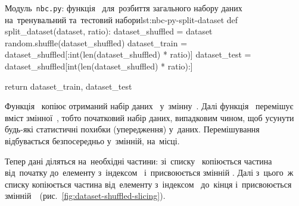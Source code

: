 \documentclass[
	a4paper,
	oneside,
	DIV = 12,
	fontsize = 13pt,
	headings = normal,
	numbers = endperiod,
]{scrartcl}
\theoremstyle{mythm}
\newcommand{\filename}[1]{\texttt{#1}}
\begin{document}
				\begin{listingpython}{Модуль~\filename{nbc.py}: функція~ для~розбиття загального набору даних на~тренувальний та~тестовий набори}{lst:nbc-py-split-dataset}
	def split_dataset(dataset, ratio):
			dataset_shuffled = dataset
			random.shuffle(dataset_shuffled)
			dataset_train = dataset_shuffled[:int(len(dataset_shuffled) * ratio)]
			dataset_test = dataset_shuffled[int(len(dataset_shuffled) * ratio):]

			return dataset_train, dataset_test
					\end{listingpython}

					Функція~ копіює отриманий набір даних~ у~змінну~. Далі функція~ перемішує вміст змінної~, тобто початковий набір даних, випадковим чином, щоб усунути будь-які статистичні похибки (упередження) у~даних. Перемішування відбувається безпосередньо у~змінній, на~місці.
					
					Тепер дані діляться на~необхідні частини: зі~списку~ копіюється частина від~початку до~елементу з~індексом~ і~присвоюється змінній . Далі з~цього~ж списку копіюється частина від~елементу з~індексом~ до~кінця і~присвоюється змінній~~(рис.~\ref{fig:dataset-shuffled-slicing}).
\end{document}
